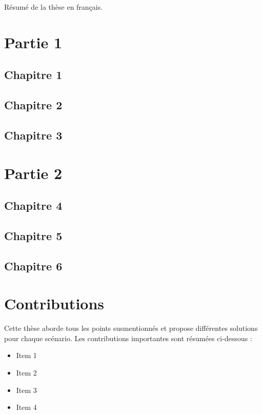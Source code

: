 \begin{resume_fr}

Résumé de la thèse en français.

\section*{Partie 1}
\subsection*{Chapitre 1}
\subsection*{Chapitre 2}
\subsection*{Chapitre 3}

\section*{Partie 2}
\subsection*{Chapitre 4}
\subsection*{Chapitre 5}
\subsection*{Chapitre 6}


\section*{Contributions}

Cette thèse aborde tous les points susmentionnés et propose différentes solutions pour chaque scénario.
Les contributions importantes sont résumées ci-dessous :
\begin{itemize}
\item Item 1
\item Item 2
\item Item 3
\item Item 4
\end{itemize}


\end{resume_fr}
